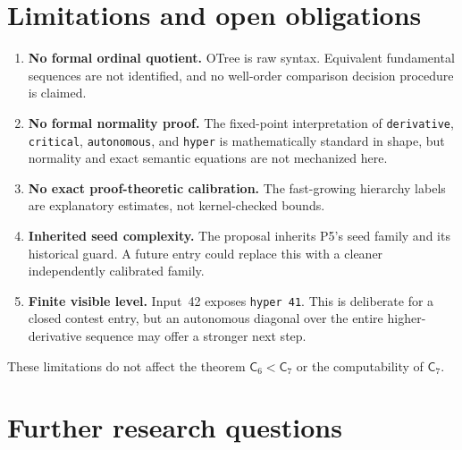 \documentclass[11pt]{article}
\theoremstyle{definition}
\theoremstyle{remark}
\newcommand{\Cseven}{\ensuremath{\mathsf{C}_7}}
\newcommand{\Csix}{\ensuremath{\mathsf{C}_6}}
\newcommand{\lean}[1]{\texttt{#1}}
\begin{document}
\section{Limitations and open obligations}

\begin{enumerate}[leftmargin=*]
\item \textbf{No formal ordinal quotient.}  OTree is raw syntax.  Equivalent
  fundamental sequences are not identified, and no well-order comparison
  decision procedure is claimed.
\item \textbf{No formal normality proof.}  The fixed-point interpretation of
  \lean{derivative}, \lean{critical}, \lean{autonomous}, and \lean{hyper} is
  mathematically standard in shape, but normality and exact semantic equations
  are not mechanized here.
\item \textbf{No exact proof-theoretic calibration.}  The fast-growing hierarchy
  labels are explanatory estimates, not kernel-checked bounds.
\item \textbf{Inherited seed complexity.}  The proposal inherits P5's seed
  family and its historical guard.  A future entry could replace this with a
  cleaner independently calibrated family.
\item \textbf{Finite visible level.}  Input~42 exposes \lean{hyper 41}.  This is
  deliberate for a closed contest entry, but an autonomous diagonal over the
  entire higher-derivative sequence may offer a stronger next step.
\end{enumerate}

These limitations do not affect the theorem $\Csix<\Cseven$ or the
computability of \Cseven.

\section{Further research questions}
\end{document}
